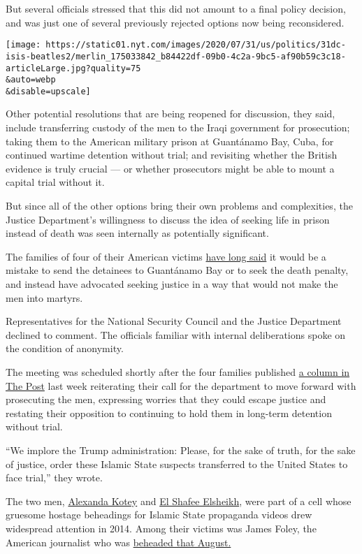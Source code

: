 But several officials stressed that this did not amount to a final
policy decision, and was just one of several previously rejected options
now being reconsidered.

\texttt{[image: https://static01.nyt.com/images/2020/07/31/us/politics/31dc-isis-beatles2/merlin\_175033842\_b84422df-09b0-4c2a-9bc5-af90b59c3c18-articleLarge.jpg?quality=75\\\&auto=webp\\\&disable=upscale]}

Other potential resolutions that are being reopened for discussion, they
said, include transferring custody of the men to the Iraqi government
for prosecution; taking them to the American military prison at
Guantánamo Bay, Cuba, for continued wartime detention without trial; and
revisiting whether the British evidence is truly crucial --- or whether
prosecutors might be able to mount a capital trial without it.

But since all of the other options bring their own problems and
complexities, the Justice Department's willingness to discuss the idea
of seeking life in prison instead of death was seen internally as
potentially significant.

The families of four of their American victims
\href{https://www.nytimes.com/2018/02/16/opinion/justice-isis-trial.html}{have
long said} it would be a mistake to send the detainees to Guantánamo Bay
or to seek the death penalty, and instead have advocated seeking justice
in a way that would not make the men into martyrs.

Representatives for the National Security Council and the Justice
Department declined to comment. The officials familiar with internal
deliberations spoke on the condition of anonymity.

The meeting was scheduled shortly after the four families published
\href{https://www.washingtonpost.com/opinions/2020/07/23/our-children-were-killed-by-islamic-state-members-they-must-face-trial/}{a
column in The Post} last week reiterating their call for the department
to move forward with prosecuting the men, expressing worries that they
could escape justice and restating their opposition to continuing to
hold them in long-term detention without trial.

``We implore the Trump administration: Please, for the sake of truth,
for the sake of justice, order these Islamic State suspects transferred
to the United States to face trial,'' they wrote.

The two men,
\href{https://www.washingtonpost.com/world/national-security/another-islamic-state-jailer-who-held-western-hostages-identified-as-londoner/2016/02/06/a0f11d28-cc10-11e5-ae11-57b6aeab993f_story.html?utm_term=.cdee9a6a6ebf}{Alexanda
Kotey} and
\href{https://www.washingtonpost.com/world/national-security/that-is-not-the-son-i-raised-how-a-british-citizen-became-one-of-the-most-notorious-members-of-isis/2016/05/23/6d66276c-1cfd-11e6-b6e0-c53b7ef63b45_story.html?utm_term=.d86c7802d277}{El
Shafee Elsheikh}, were part of a cell whose gruesome hostage beheadings
for Islamic State propaganda videos drew widespread attention in 2014.
Among their victims was James Foley, the American journalist who was
\href{https://www.nytimes.com/2014/08/20/world/middleeast/isis-james-foley-syria-execution.html?module=inline}{beheaded
that August.}

